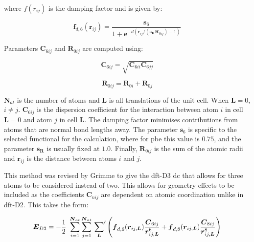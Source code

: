 where \( f(r_{ij}) \) is the damping factor and is given by:

\begin{equation}
\boldsymbol{f}_{d,6}(\boldsymbol{r}_{ij}) = \frac{\boldsymbol{s}_6}{1 + \boldsymbol{e}^{-d(\boldsymbol{r}_{ij} / (\boldsymbol{s}_{\boldsymbol{R}} \boldsymbol{R}_{0ij})-1)}} 
\end{equation}

Parameters \( \boldsymbol{C}_{6ij} \) and \( \boldsymbol{R}_{0ij} \) are computed using:

\begin{equation}
\boldsymbol{C}_{6ij} = \sqrt{\boldsymbol{C}_{6ii} \boldsymbol{C}_{6jj}} 
\end{equation}

\begin{equation}
\boldsymbol{R}_{0ij} = \boldsymbol{R}_{0i} + \boldsymbol{R}_{0j} 
\end{equation}

\(\boldsymbol{N}_{at}\) is the number of atoms and \(\boldsymbol{L}\) is all translations of the unit cell. When \(\boldsymbol{L} = 0\), \(i \neq j\). \(\boldsymbol{C}_{6ij}\) is the dispersion coefficient for the interaction between atom \(i\) in cell \(\boldsymbol{L} = 0\) and atom \(j\) in cell \(\boldsymbol{L}\). The damping factor minimises contributions from atoms that are normal bond lengths away. The parameter \(\boldsymbol{s}_6\) is specific to the selected functional for the calculation, where for \acrshort{pbe} this value is \(0.75\), and  the parameter \(\boldsymbol{s}_{\boldsymbol{R}}\) is usually fixed at \(1.0\). Finally, \(\boldsymbol{R}_{0ij}\) is the sum of the atomic radii and \(\boldsymbol{r}_{ij}\) is the distance between atoms \(i\) and \(j\).
\DIFdelbegin {}\DIFdelend 

This method was revised by Grimme to give the \acrshort{dft}\nobreakdash-D3 \DIFdelbegin \DIFdel{~}\DIFdelend \cite{Grimme2010} \acrshort{dc} that allows for three atoms to be considered instead of two. This allows for geometry effects to be included as the coefficients \(\boldsymbol{C}_{nij}\) are dependent on atomic coordination unlike in \acrshort{dft}\nobreakdash-D2. This takes the form:

\begin{equation}
\boldsymbol{E}_{D3} = -\frac{1}{2}\ \sum_{i=1}^{\boldsymbol{N}_{at}} \sum_{j=1}^{\boldsymbol{N}_{at}} \sideset{}{'}\sum_{\boldsymbol{L}} \left(\boldsymbol{f}_{d,6} (\boldsymbol{r}_{ij, \boldsymbol{L}}) \frac{\boldsymbol{C}_{6ij}}{\boldsymbol{r}_{ij,\boldsymbol{L}}^6} + \boldsymbol{f}_{d,8} (\boldsymbol{r}_{ij, \boldsymbol{L}}) \frac{\boldsymbol{C}_{8ij}}{\boldsymbol{r}_{ij,\boldsymbol{L}}^8}\right)
\end{equation}

